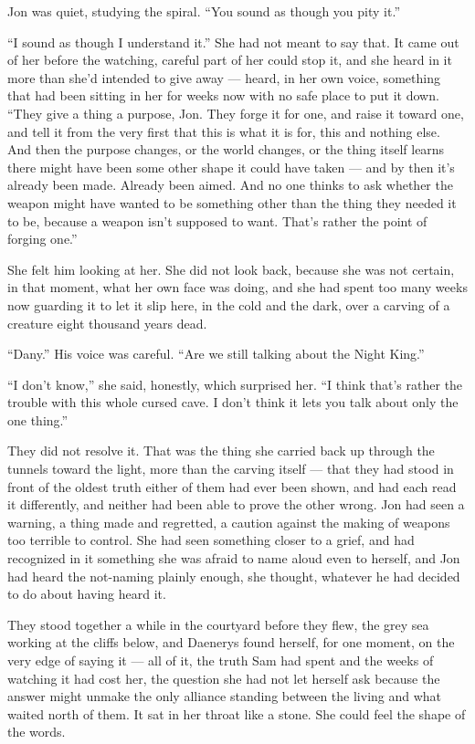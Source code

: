Jon was quiet, studying the spiral. “You sound as though you pity it.”

“I sound as though I understand it.” She had not meant to say that. It came out of her before the watching, careful part of her could stop it, and she heard in it more than she’d intended to give away — heard, in her own voice, something that had been sitting in her for weeks now with no safe place to put it down. “They give a thing a purpose, Jon. They forge it for one, and raise it toward one, and tell it from the very first that this is what it is for, this and nothing else. And then the purpose changes, or the world changes, or the thing itself learns there might have been some other shape it could have taken — and by then it’s already been made. Already been aimed. And no one thinks to ask whether the weapon might have wanted to be something other than the thing they needed it to be, because a weapon isn’t supposed to want. That’s rather the point of forging one.”

She felt him looking at her. She did not look back, because she was not certain, in that moment, what her own face was doing, and she had spent too many weeks now guarding it to let it slip here, in the cold and the dark, over a carving of a creature eight thousand years dead.

“Dany.” His voice was careful. “Are we still talking about the Night King.”

“I don’t know,” she said, honestly, which surprised her. “I think that’s rather the trouble with this whole cursed cave. I don’t think it lets you talk about only the one thing.”

\sceneBreak

They did not resolve it. That was the thing she carried back up through the tunnels toward the light, more than the carving itself — that they had stood in front of the oldest truth either of them had ever been shown, and had each read it differently, and neither had been able to prove the other wrong. Jon had seen a warning, a thing made and regretted, a caution against the making of weapons too terrible to control. She had seen something closer to a grief, and had recognized in it something she was afraid to name aloud even to herself, and Jon had heard the not-naming plainly enough, she thought, whatever he had decided to do about having heard it.

They stood together a while in the courtyard before they flew, the grey sea working at the cliffs below, and Daenerys found herself, for one moment, on the very edge of saying it — all of it, the truth Sam had spent and the weeks of watching it had cost her, the question she had not let herself ask because the answer might unmake the only alliance standing between the living and what waited north of them. It sat in her throat like a stone. She could feel the shape of the words.

